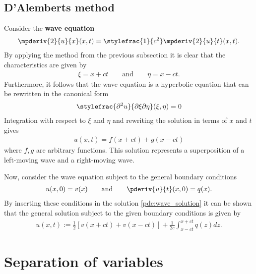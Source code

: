 \subsection{D'Alemberts method}

    Consider the \textbf{wave equation}
    \begin{gather}
        \label{pde:wave_equation}
        \mpderiv{2}{u}{x}(x,t) = \stylefrac{1}{c^2}\mpderiv{2}{u}{t}(x,t).
    \end{gather}
    By applying the method from the previous subsection it is clear that the characteristics are given by
    \begin{gather}
        \xi = x + ct\qquad\text{and}\qquad \eta = x - ct.
    \end{gather}
    Furthermore, it follows that the wave equation is a hyperbolic equation that can be rewritten in the canonical form
    \begin{gather}
        \label{pde:canonical_wave_equation}
        \stylefrac{\partial^2u}{\partial\xi\partial\eta}(\xi,\eta) = 0
    \end{gather}
    Integration with respect to $\xi$ and $\eta$ and rewriting the solution in terms of $x$ and $t$ gives
    \begin{gather}
        \label{pde:wave_solution}
        u(x,t) = f(x+ct) + g(x-ct)
    \end{gather}
    where $f,g$ are arbitrary functions. This solution represents a superposition of a left-moving wave and a right-moving wave.

    Now, consider the wave equation subject to the general boundary conditions
    \begin{gather}
        u(x,0) = v(x)\qquad\text{and}\qquad \pderiv{u}{t}(x,0) = q(x).
    \end{gather}
    By inserting these conditions in the solution \ref{pde:wave_solution} it can be shown that the general solution subject to the given boundary conditions is given by
    \begin{gather}
        \label{pde:dalembert_solution}
        u(x,t) := \frac{1}{2}\left[v(x+ct) + v(x-ct)\right] + \frac{1}{2c}\int_{x-ct}^{x+ct}q(z)dz.
    \end{gather}

\section{Separation of variables}\label{section:separation_of_variables}

